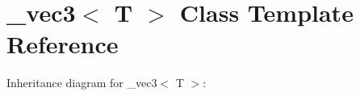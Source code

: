 \hypertarget{class__vec3}{}\section{\+\_\+vec3$<$ T $>$ Class Template Reference}
\label{class__vec3}


Inheritance diagram for \+\_\+vec3$<$ T $>$\+:
